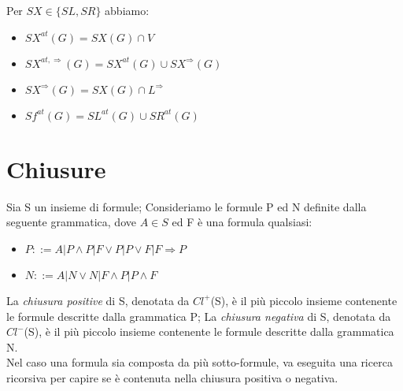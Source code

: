 \documentclass[\main/tesi.tex]{subfiles}
\begin{document}
Per \(SX \in \{SL, SR\}\) abbiamo:
\begin{itemize}
    \item $SX^{at}(G) = SX(G) \cap V$
    \item $SX^{at, \Rightarrow}(G) = SX^{at}(G) \cup SX^{\Rightarrow}(G)$
    \item $SX^{\Rightarrow}(G) = SX(G) \cap L^{\Rightarrow}$
    \item $Sf^{at}(G) = SL^{at}(G) \cup SR^{at}(G)$
\end{itemize}

\section{Chiusure}

Sia S un insieme di formule; Consideriamo le formule P ed N definite dalla seguente grammatica, dove \(A \in S\) ed F è una formula qualsiasi:
\begin{itemize}
    \item \(P ::= A|P \land P|F \lor P|P \lor F|F \Rightarrow P\)
    \item \(N ::= A|N \lor N|F \land P|P \land F\)
\end{itemize}
La \textit{chiusura positive} di S, denotata da $Cl^+$(S), è il più piccolo insieme contenente le formule descritte dalla grammatica P;
La \textit{chiusura negativa} di S, denotata da $Cl^-$(S), è il più piccolo insieme contenente le formule descritte dalla grammatica N. \\

Nel caso una formula sia composta da più sotto-formule, va eseguita una ricerca ricorsiva per capire se è contenuta nella chiusura positiva o negativa. \\
\end{document}
